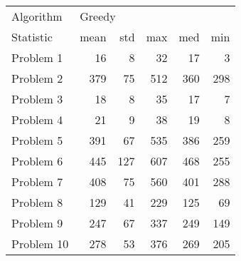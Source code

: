 \begin{tabular}{lrrrrr}
\toprule
Algorithm & \multicolumn{5}{l}{Greedy} \\
Statistic &   mean &  std &  max &  med &  min \\
\midrule
Problem 1  &     16 &    8 &   32 &   17 &    3 \\
Problem 2  &    379 &   75 &  512 &  360 &  298 \\
Problem 3  &     18 &    8 &   35 &   17 &    7 \\
Problem 4  &     21 &    9 &   38 &   19 &    8 \\
Problem 5  &    391 &   67 &  535 &  386 &  259 \\
Problem 6  &    445 &  127 &  607 &  468 &  255 \\
Problem 7  &    408 &   75 &  560 &  401 &  288 \\
Problem 8  &    129 &   41 &  229 &  125 &   69 \\
Problem 9  &    247 &   67 &  337 &  249 &  149 \\
Problem 10 &    278 &   53 &  376 &  269 &  205 \\
\bottomrule
\end{tabular}
